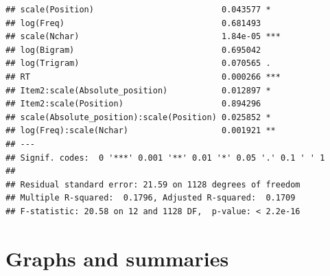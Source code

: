 \documentclass{article}\usepackage[]{graphicx}\usepackage[]{color}
\makeatletter
\newenvironment{kframe}{%
 \def\at@end@of@kframe{}%
 \ifinner\ifhmode%
  \def\at@end@of@kframe{\end{minipage}}%
  \begin{minipage}{\columnwidth}%
 \fi\fi%
 \def\FrameCommand##1{\hskip\@totalleftmargin \hskip-\fboxsep
 \colorbox{shadecolor}{##1}\hskip-\fboxsep
     \hskip-\linewidth \hskip-\@totalleftmargin \hskip\columnwidth}%
 \MakeFramed {\advance\hsize-\width
   \@totalleftmargin\z@ \linewidth\hsize
   \@setminipage}}%
 {\par\unskip\endMakeFramed%
 \at@end@of@kframe}
\newenvironment{knitrout}{}{} %
\makeatother
\begin{document}
\begin{knitrout}
\begin{kframe}
\begin{verbatim}
## scale(Position)                          0.043577 *  
## log(Freq)                                0.681493    
## scale(Nchar)                             1.84e-05 ***
## log(Bigram)                              0.695042    
## log(Trigram)                             0.070565 .  
## RT                                       0.000266 ***
## Item2:scale(Absolute_position)           0.012897 *  
## Item2:scale(Position)                    0.894296    
## scale(Absolute_position):scale(Position) 0.025852 *  
## log(Freq):scale(Nchar)                   0.001921 ** 
## ---
## Signif. codes:  0 '***' 0.001 '**' 0.01 '*' 0.05 '.' 0.1 ' ' 1
## 
## Residual standard error: 21.59 on 1128 degrees of freedom
## Multiple R-squared:  0.1796,	Adjusted R-squared:  0.1709 
## F-statistic: 20.58 on 12 and 1128 DF,  p-value: < 2.2e-16
\end{verbatim}
\end{kframe}
\end{knitrout}

\section{Graphs and summaries}
\end{document}

